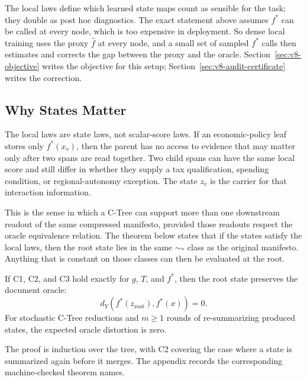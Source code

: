 The local laws define which learned state maps count as sensible for
the task; they double as post hoc diagnostics. The exact statement
above assumes \(f^\ast\) can be called at every node, which is too
expensive in deployment. So dense local training uses the proxy
\(\widehat f\) at every node, and a small set of sampled \(f^\ast\)
calls then estimates and corrects the gap between the proxy and the
oracle. Section~\ref{sec:v8-objective} writes the objective for this
setup; Section~\ref{sec:v8-audit-certificate} writes the correction.

\subsection{Why States Matter}

The local laws are state laws, not scalar-score laws. If an economic-policy
leaf stores only \(f^\ast(x_v)\), then the parent has no access to evidence
that may matter only after two spans are read together. Two child spans can
have the same local score and still differ in whether they supply a tax
qualification, spending condition, or regional-autonomy exception. The state
\(z_v\) is the carrier for that interaction information.

This is the sense in which a C-Tree can support more than one downstream
readout of the same compressed manifesto, provided those readouts
respect the oracle equivalence relation. The theorem below states that
if the states satisfy the local laws, then the root state lies in the
same \(\sim_\ast\) class as the original manifesto. Anything that is
constant on those classes can then be evaluated at the root.

\begin{theorem}\label{thm:v8-root-preservation}
If C1, C2, and C3 hold exactly for \(g\), \(T\), and \(f^\ast\), then the root
state preserves the document oracle:
\[
  d_Y\!\left(f^\ast(z_{\mathrm{root}}),f^\ast(x)\right)=0 .
\]
For stochastic C-Tree reductions and \(m\ge 1\) rounds of
re-summarizing produced states, the expected oracle distortion is
zero.
\end{theorem}

The proof is induction over the tree, with C2 covering the case where
a state is summarized again before it merges. The appendix records the
corresponding machine-checked theorem names.

